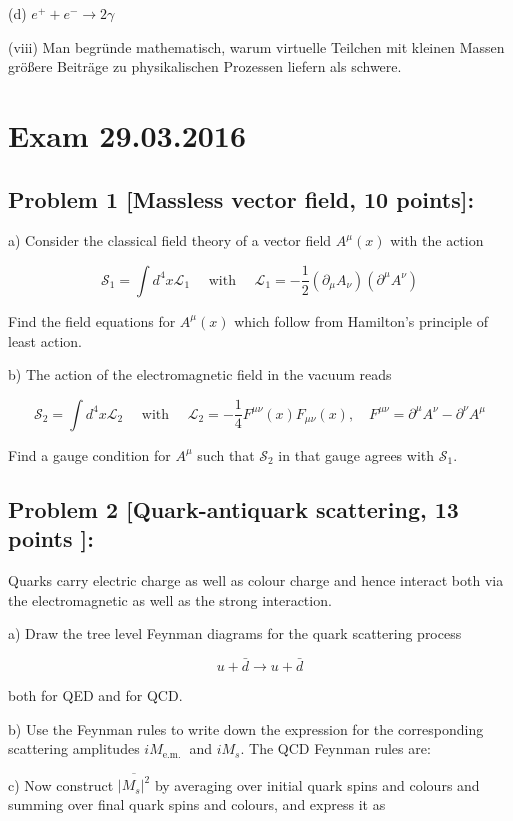 \documentclass[10pt, letterpaper]{article}
\begin{document}
(d) $e^{+}+e^{-} \rightarrow 2 \gamma$


(viii) Man begründe mathematisch, warum virtuelle Teilchen mit kleinen Massen größere Beiträge zu physikalischen Prozessen liefern als schwere.
\pagebreak

\section{Exam 29.03.2016}


\subsection{Problem 1 [Massless vector field, 10 points]:}

a) Consider the classical field theory of a vector field $A^\mu(x)$ with the action

$$
\mathcal{S}_1=\int d^4 x \mathcal{L}_1 \quad \text { with } \quad \mathcal{L}_1=-\frac{1}{2}\left(\partial_\mu A_\nu\right)\left(\partial^\mu A^\nu\right)
$$

Find the field equations for $A^\mu(x)$ which follow from Hamilton's principle of least action.

b) The action of the electromagnetic field in the vacuum reads

$$
\mathcal{S}_2=\int d^4 x \mathcal{L}_2 \quad \text { with } \quad \mathcal{L}_2=-\frac{1}{4} F^{\mu \nu}(x) F_{\mu \nu}(x), \quad F^{\mu \nu}=\partial^\mu A^\nu-\partial^\nu A^\mu
$$


Find a gauge condition for $A^\mu$ such that $\mathcal{S}_2$ in that gauge agrees with $\mathcal{S}_1$.


\subsection{Problem 2 [Quark-antiquark scattering, 13 points ]:}
Quarks carry electric charge as well as colour charge and hence interact both via the electromagnetic as well as the strong interaction.

a) Draw the tree level Feynman diagrams for the quark scattering process

$$
u+\bar{d} \rightarrow u+\bar{d}
$$

both for QED and for QCD.

b) Use the Feynman rules to write down the expression for the corresponding scattering amplitudes $i M_{\text {e.m. }}$ and $i M_s$. The QCD Feynman rules are:

c) Now construct $\overline{\left|M_s\right|^2}$ by averaging over initial quark spins and colours and summing over final quark spins and colours, and express it as
\end{document}
